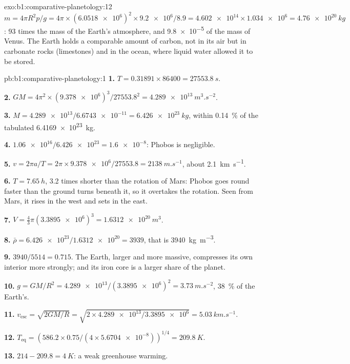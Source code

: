 \begin{solution}{exo:b1:comparative-planetology:12}
$m = 4\pi R^2p/g = 4\pi\times(\num{6.0518e6})^2\times\num{9.2e6}/8.9 =
\num{4.602e14}\times\num{1.034e6} = \qty{4.76e20}{kg}$: 93 times the mass of
the Earth's atmosphere, and \num{9.8e-5} of the mass of Venus. The Earth
holds a comparable amount of carbon, not in its air but in carbonate rocks
(limestones) and in the ocean, where liquid water allowed it to be stored.
\end{solution}

\begin{solution}{pb:b1:comparative-planetology:1}
\textbf{1.} $T = 0.31891\times86400 = \qty{27553.8}{s}$.

\textbf{2.} $GM = 4\pi^2\times(\num{9.378e6})^3/\num{27553.8}^2 =
\qty{4.289e13}{m^3.s^{-2}}$.

\textbf{3.} $M = \num{4.289e13}/\num{6.6743e-11} = \qty{6.426e23}{kg}$,
within \qty{0.14}{\percent} of the tabulated \qty{6.4169e23}{kg}.

\textbf{4.} $\num{1.06e16}/\num{6.426e23} = \num{1.6e-8}$: Phobos is
negligible.

\textbf{5.} $v = 2\pi a/T = 2\pi\times\num{9.378e6}/27553.8 =
\qty{2138}{m.s^{-1}}$, about \qty{2.1}{km.s^{-1}}.

\textbf{6.} $T = \qty{7.65}{h}$, 3.2 times shorter than the rotation of
Mars: Phobos goes round faster than the ground turns beneath it, so it
overtakes the rotation. Seen from Mars, it rises in the west and sets in
the east.

\textbf{7.} $V = \tfrac43\pi(\num{3.3895e6})^3 = \qty{1.6312e20}{m^3}$.

\textbf{8.} $\bar\rho = \num{6.426e23}/\num{1.6312e20} = 3939$, that is
\qty{3940}{kg.m^{-3}}.

\textbf{9.} $3940/5514 = 0.715$. The Earth, larger and more massive,
compresses its own interior more strongly; and its iron core is a larger
share of the planet.

\textbf{10.} $g = GM/R^2 = \num{4.289e13}/(\num{3.3895e6})^2 =
\qty{3.73}{m.s^{-2}}$, \qty{38}{\percent} of the Earth's.

\textbf{11.} $v_\mathrm{esc} = \sqrt{2GM/R} = \sqrt{2\times\num{4.289e13}/
\num{3.3895e6}} = \qty{5.03}{km.s^{-1}}$.

\textbf{12.} $T_\mathrm{eq} = (586.2\times0.75/(4\times\num{5.6704e-8}))^{1/4}
= \qty{209.8}{K}$.

\textbf{13.} $214 - 209.8 = \qty{4}{K}$: a weak greenhouse warming.


\end{solution}
